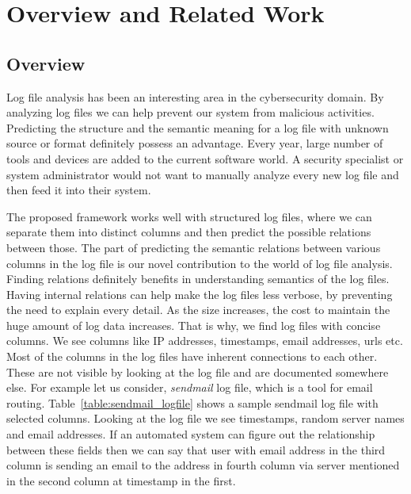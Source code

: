 \chapter{Overview and Related Work}
\thispagestyle{plain}
\label{Overview}


\section{Overview}
Log file analysis has been an interesting area in the cybersecurity domain. By analyzing log files we can help prevent our system from malicious activities. Predicting the structure and the semantic meaning for a log file with unknown source or format definitely possess an advantage. Every year, large number of tools and devices are added to the current software world. A security specialist or system administrator would not want to manually analyze every new log file and then feed it into their system. 

The proposed framework works well with structured log files, where we can separate them into distinct columns and then predict the possible relations between those. The part of predicting the semantic relations between various columns in the log file is our novel contribution to the world of log file analysis. Finding relations definitely benefits in understanding semantics of the log files. Having internal relations can help make the log files less verbose, by preventing the need to explain every detail. As the size increases, the cost to maintain the huge amount of log data increases. That is why, we find log files with concise columns. We see columns like IP addresses, timestamps, email addresses, urls etc. Most of the columns in the log files have inherent connections to each other. These are not visible by looking at the log file and are documented somewhere else. For example let us consider, \textit{sendmail} log file, which is a tool for email routing. Table~\ref{table:sendmail_logfile} shows a sample sendmail log file with selected columns. Looking at the log file we see timestamps, random server names and email addresses. If an automated system can figure out the relationship between these fields then we can say that user with email address in the third column is sending an email to the address in fourth column via server mentioned in the second column at timestamp in the first.


